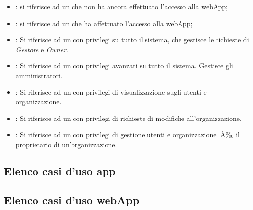 \documentclass[../analisi-dei-requisiti]{subfiles}
\begin{document}
\begin{itemize}
  \item \textbf{}: si riferisce ad un  che non ha ancora effettuato l'accesso alla webApp;
  \item \textbf{}: si riferisce ad un  che ha affettuato l'accesso alla webApp;
  \item \textbf{}: Si riferisce ad un  con privilegi su tutto il sistema, che gestisce le richieste di \emph{Gestore} e \emph{Owner}.
  \item \textbf{}: Si riferisce ad un  con privilegi avanzati su tutto il sistema. Gestisce gli amministratori.
  \item \textbf{}: Si riferisce ad un  con privilegi di visualizzazione sugli utenti e organizzazione.
  \item \textbf{}: Si riferisce ad un  con privilegi di richieste di modifiche all'organizzazione.
  \item \textbf{}: Si riferisce ad un  con privilegi di gestione utenti e organizzazione. Ã‰ il proprietario di un'organizzazione.
\end{itemize}


\subsection{Elenco casi d'uso app}
\label{sub:casi_duso_app}

\subsection{Elenco casi d'uso webApp}
\label{sub:casi_duso_webApp}

\end{document}
